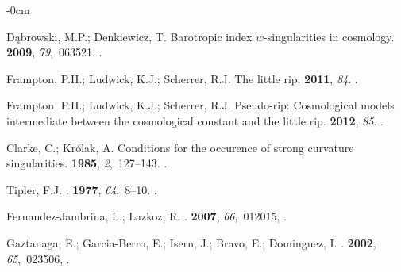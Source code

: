 \documentclass[universe,article,accept,moreauthors,pdftex]{Definitions/mdpi}
\begin{document}
\begin{adjustwidth}{-\extralength}{0cm}
\begin{thebibliography}{999}
D\k{a}browski, M.P.; Denkiewicz, T.
\newblock Barotropic index $w$-singularities in cosmology.
 {\bf 2009}, {\em 79},~063521.
\newblock
{\href{https://doi.org/10.1103/PhysRevD.79.063521}{}}.

Frampton, P.H.; Ludwick, K.J.; Scherrer, R.J.
\newblock The little rip.
 {\bf 2011}, {\em 84}.
\newblock
{\href{https://doi.org/10.1103/physrevd.84.063003}{}}.

Frampton, P.H.; Ludwick, K.J.; Scherrer, R.J.
\newblock Pseudo-rip: Cosmological models intermediate between the cosmological
  constant and the little rip.
 {\bf 2012}, {\em 85}.
\newblock
{\href{https://doi.org/10.1103/physrevd.85.083001}{}}.

Clarke, C.; Królak, A.
\newblock Conditions for the occurence of strong curvature singularities.
 {\bf 1985}, {\em 2},~127--143.
\newblock
{\href{https://doi.org/https://doi.org/10.1016/0393-0440(85)90012-9}{}}.

Tipler, F.J.
.
 {\bf 1977}, {\em 64},~8--10.
\newblock
{\href{https://doi.org/10.1016/0375-9601(77)90508-4}{}}.

Fernandez-Jambrina, L.; Lazkoz, R.
.
 {\bf 2007}, {\em 66},~012015,
{\href{https://doi.org/10.1088/1742-6596/66/1/012015}{}}.

Gaztanaga, E.; Garcia-Berro, E.; Isern, J.; Bravo, E.; Dominguez, I. %
.
 {\bf 2002}, {\em 65},~023506,
{\href{https://doi.org/10.1103/PhysRevD.65.023506}{}}.


\end{thebibliography}
\end{adjustwidth}
\end{document}

